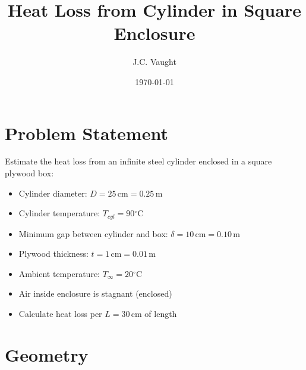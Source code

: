 \documentclass[11pt]{article}
\title{\textbf{Heat Loss from Cylinder in Square Enclosure}}
\author{J.C. Vaught}
\date{\today}
\newcommand{\degC}{$^\circ$C}
\newcommand{\unit}[1]{\,\mathrm{#1}}
\begin{document}
\maketitle

\section{Problem Statement}

Estimate the heat loss from an infinite steel cylinder enclosed in a square plywood box:
\begin{itemize}
    \item Cylinder diameter: $D = 25\unit{cm} = 0.25\unit{m}$
    \item Cylinder temperature: $T_{cyl} = 90$\degC
    \item Minimum gap between cylinder and box: $\delta = 10\unit{cm} = 0.10\unit{m}$
    \item Plywood thickness: $t = 1\unit{cm} = 0.01\unit{m}$
    \item Ambient temperature: $T_\infty = 20$\degC
    \item Air inside enclosure is stagnant (enclosed)
    \item Calculate heat loss per $L = 30\unit{cm}$ of length
\end{itemize}

\section{Geometry}
\end{document}
